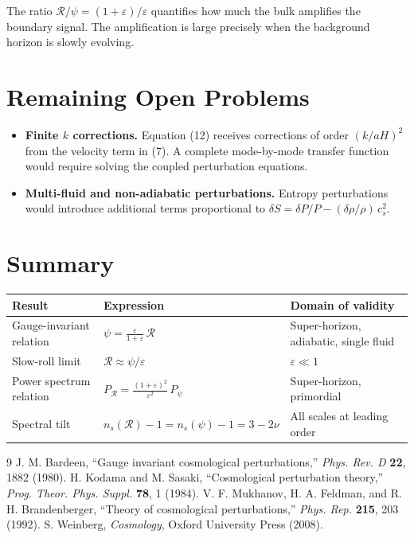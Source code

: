 \documentclass[12pt,a4paper]{article}
\begin{document}
The ratio $\mathcal{R}/\psi = (1+\varepsilon)/\varepsilon$ quantifies how much the bulk amplifies the boundary signal. The amplification is large precisely when the background horizon is slowly evolving.

\section{Remaining Open Problems}

\begin{itemize}
  \item \textbf{Finite $k$ corrections.} Equation (12) receives corrections of order $(k/aH)^2$ from the velocity term in (7). A complete mode-by-mode transfer function would require solving the coupled perturbation equations.
  \item \textbf{Multi-fluid and non-adiabatic perturbations.} Entropy perturbations would introduce additional terms proportional to $\delta S = \delta P/P - (\delta\rho/\rho)\,c_s^2$.
\end{itemize}

\section{Summary}

\begin{table}[h]
\centering
\begin{tabular}{lll}
\toprule
Result & Expression & Domain of validity \\
\midrule
Gauge-invariant relation & $\psi = \frac{\varepsilon}{1+\varepsilon}\,\mathcal{R}$ & Super-horizon, adiabatic, single fluid \\
Slow-roll limit & $\mathcal{R} \approx \psi/\varepsilon$ & $\varepsilon \ll 1$ \\
Power spectrum relation & $P_\mathcal{R} = \frac{(1+\varepsilon)^2}{\varepsilon^2}\,P_\psi$ & Super-horizon, primordial \\
Spectral tilt & $n_s(\mathcal{R}) - 1 = n_s(\psi) - 1 = 3 - 2\nu$ & All scales at leading order \\
\bottomrule
\end{tabular}
\end{table}

\begin{thebibliography}{9}
 J. M. Bardeen, ``Gauge invariant cosmological perturbations,'' \textit{Phys. Rev. D} \textbf{22}, 1882 (1980).
 H. Kodama and M. Sasaki, ``Cosmological perturbation theory,'' \textit{Prog. Theor. Phys. Suppl.} \textbf{78}, 1 (1984).
 V. F. Mukhanov, H. A. Feldman, and R. H. Brandenberger, ``Theory of cosmological perturbations,'' \textit{Phys. Rep.} \textbf{215}, 203 (1992).
 S. Weinberg, \textit{Cosmology}, Oxford University Press (2008).
\end{thebibliography}
\end{document}
